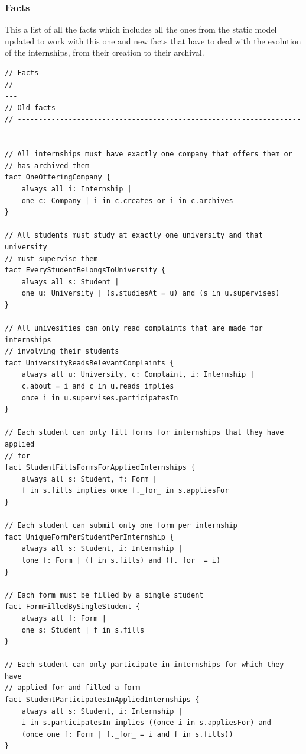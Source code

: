 \documentclass[11pt,twoside]{article}
\begin{document}
	\subsubsection{Facts}
This a list of all the facts which includes all the ones from the static model updated to work with this one and new facts that have to deal with the evolution of the internships, from their creation to their archival. \\
{\small
\begin{verbatim}
// Facts
// ----------------------------------------------------------------------
// Old facts
// ----------------------------------------------------------------------

// All internships must have exactly one company that offers them or
// has archived them
fact OneOfferingCompany {
    always all i: Internship |
    one c: Company | i in c.creates or i in c.archives
}

// All students must study at exactly one university and that university
// must supervise them
fact EveryStudentBelongsToUniversity {
    always all s: Student | 
    one u: University | (s.studiesAt = u) and (s in u.supervises)
}

// All univesities can only read complaints that are made for internships
// involving their students
fact UniversityReadsRelevantComplaints {
    always all u: University, c: Complaint, i: Internship |
    c.about = i and c in u.reads implies
    once i in u.supervises.participatesIn
}

// Each student can only fill forms for internships that they have applied
// for
fact StudentFillsFormsForAppliedInternships {
    always all s: Student, f: Form |
    f in s.fills implies once f._for_ in s.appliesFor
}

// Each student can submit only one form per internship
fact UniqueFormPerStudentPerInternship {
    always all s: Student, i: Internship |
    lone f: Form | (f in s.fills) and (f._for_ = i)
}

// Each form must be filled by a single student
fact FormFilledBySingleStudent {
    always all f: Form |
    one s: Student | f in s.fills
}

// Each student can only participate in internships for which they have
// applied for and filled a form
fact StudentParticipatesInAppliedInternships {
    always all s: Student, i: Internship |
    i in s.participatesIn implies ((once i in s.appliesFor) and
    (once one f: Form | f._for_ = i and f in s.fills))
}


\end{verbatim}}
\end{document}
